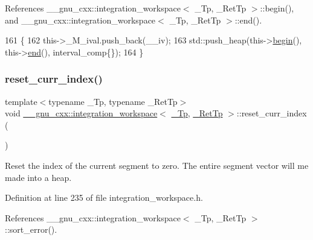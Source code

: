 References \+\_\+\+\_\+gnu\+\_\+cxx\+::integration\+\_\+workspace$<$ \+\_\+\+Tp, \+\_\+\+Ret\+Tp $>$\+::begin(), and \+\_\+\+\_\+gnu\+\_\+cxx\+::integration\+\_\+workspace$<$ \+\_\+\+Tp, \+\_\+\+Ret\+Tp $>$\+::end().


\begin{DoxyCode}
161       \{
162         this->\_M\_ival.push\_back(\_\_iv);
163         std::push\_heap(this->\hyperlink{class____gnu__cxx_1_1integration__workspace_a9ecef94e75c1bc84e59300fe6504eed9}{begin}(), this->\hyperlink{class____gnu__cxx_1_1integration__workspace_a0494e3b36de996e0a85552aaaac11c03}{end}(), interval\_comp\{\});
164       \}
\end{DoxyCode}
\mbox{\label{class____gnu__cxx_1_1integration__workspace_a3e86f552adb2892e7a771fa502174be3}} 
\subsubsection{\texorpdfstring{reset\+\_\+curr\+\_\+index()}{reset\_curr\_index()}}
{\footnotesize\ttfamily template$<$typename \+\_\+\+Tp, typename \+\_\+\+Ret\+Tp$>$ \\
void \hyperlink{class____gnu__cxx_1_1integration__workspace}{\+\_\+\+\_\+gnu\+\_\+cxx\+::integration\+\_\+workspace}$<$ \hyperlink{namespace____gnu__cxx_a3b19a9c800ca194374ef9172290f7d79}{\+\_\+\+Tp}, \hyperlink{namespace____gnu__cxx_a886e03ece3d53ff7fa6c098a40f93fa5}{\+\_\+\+Ret\+Tp} $>$\+::reset\+\_\+curr\+\_\+index (\begin{DoxyParamCaption}{ }\end{DoxyParamCaption})\hspace{0.3cm}{\ttfamily [inline]}}

Reset the index of the current segment to zero. The entire segment vector will me made into a heap. 

Definition at line 235 of file integration\+\_\+workspace.\+h.



References \+\_\+\+\_\+gnu\+\_\+cxx\+::integration\+\_\+workspace$<$ \+\_\+\+Tp, \+\_\+\+Ret\+Tp $>$\+::sort\+\_\+error().


